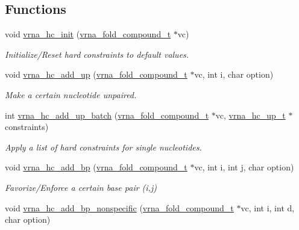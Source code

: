 \subsection*{Functions}
\begin{DoxyCompactItemize}
\item 
void \hyperlink{group__hard__constraints_ga36ff456c43bf920629cee5a236e4f0ff}{vrna\+\_\+hc\+\_\+init} (\hyperlink{group__fold__compound_ga1b0cef17fd40466cef5968eaeeff6166}{vrna\+\_\+fold\+\_\+compound\+\_\+t} $\ast$vc)
\begin{DoxyCompactList}\small\item\em Initialize/\+Reset hard constraints to default values. \end{DoxyCompactList}\item 
void \hyperlink{group__hard__constraints_gaeb352e3e6ccd2b567bafa451365bb545}{vrna\+\_\+hc\+\_\+add\+\_\+up} (\hyperlink{group__fold__compound_ga1b0cef17fd40466cef5968eaeeff6166}{vrna\+\_\+fold\+\_\+compound\+\_\+t} $\ast$vc, int i, char option)
\begin{DoxyCompactList}\small\item\em Make a certain nucleotide unpaired. \end{DoxyCompactList}\item 
int \hyperlink{group__hard__constraints_ga5070f296c8af2baea10951525519464f}{vrna\+\_\+hc\+\_\+add\+\_\+up\+\_\+batch} (\hyperlink{group__fold__compound_ga1b0cef17fd40466cef5968eaeeff6166}{vrna\+\_\+fold\+\_\+compound\+\_\+t} $\ast$vc, \hyperlink{group__hard__constraints_ga8cd53427a942a81c87ec526bbff32ef9}{vrna\+\_\+hc\+\_\+up\+\_\+t} $\ast$constraints)
\begin{DoxyCompactList}\small\item\em Apply a list of hard constraints for single nucleotides. \end{DoxyCompactList}\item 
void \hyperlink{group__hard__constraints_gac49305fc5c7d8653c5fbd2de1e1615e2}{vrna\+\_\+hc\+\_\+add\+\_\+bp} (\hyperlink{group__fold__compound_ga1b0cef17fd40466cef5968eaeeff6166}{vrna\+\_\+fold\+\_\+compound\+\_\+t} $\ast$vc, int i, int j, char option)
\begin{DoxyCompactList}\small\item\em Favorize/\+Enforce a certain base pair (i,j) \end{DoxyCompactList}\item 
void \hyperlink{group__hard__constraints_gadeb1083d0dc928e1e931065aae54ad82}{vrna\+\_\+hc\+\_\+add\+\_\+bp\+\_\+nonspecific} (\hyperlink{group__fold__compound_ga1b0cef17fd40466cef5968eaeeff6166}{vrna\+\_\+fold\+\_\+compound\+\_\+t} $\ast$vc, int i, int d, char option)

\end{DoxyCompactItemize}
